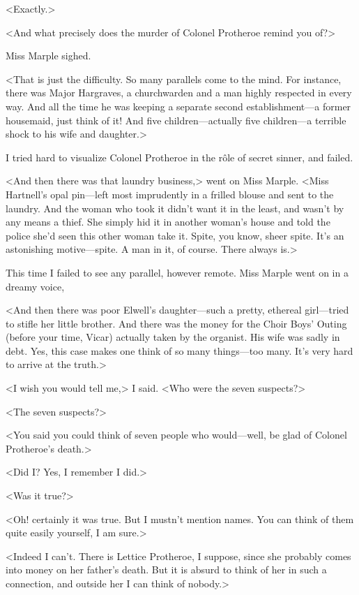 <Exactly.>

<And what precisely does the murder of Colonel Protheroe remind you of?>

Miss Marple sighed.

<That is just the difficulty. So many parallels come to the mind. For instance, there was Major Hargraves, a churchwarden and a man highly respected in every way. And all the time he was keeping a separate second establishment—a former housemaid, just think of it! And five children—actually five children—a terrible shock to his wife and daughter.>

I tried hard to visualize Colonel Protheroe in the rôle of secret sinner, and failed.

<And then there was that laundry business,> went on Miss Marple. <Miss Hartnell's opal pin—left most imprudently in a frilled blouse and sent to the laundry. And the woman who took it didn't want it in the least, and wasn't by any means a thief. She simply hid it in another woman's house and told the police she'd seen this other woman take it. Spite, you know, sheer spite. It's an astonishing motive—spite. A man in it, of course. There always is.>

This time I failed to see any parallel, however remote. Miss Marple went on in a dreamy voice,

<And then there was poor Elwell's daughter—such a pretty, ethereal girl—tried to stifle her little brother. And there was the money for the Choir Boys' Outing (before your time, Vicar) actually taken by the organist. His wife was sadly in debt. Yes, this case makes one think of so many things—too many. It's very hard to arrive at the truth.>

<I wish you would tell me,> I said. <Who were the seven suspects?>

<The seven suspects?>

<You said you could think of seven people who would—well, be glad of Colonel Protheroe's death.>

<Did I? Yes, I remember I did.>

<Was it true?>

<Oh! certainly it was true. But I mustn't mention names. You can think of them quite easily yourself, I am sure.>

<Indeed I can't. There is Lettice Protheroe, I suppose, since she probably comes into money on her father's death. But it is absurd to think of her in such a connection, and outside her I can think of nobody.>

